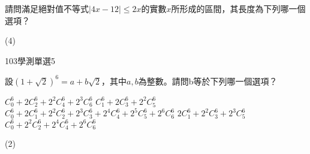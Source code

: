 \begin{QUESTIONS}
\begin{QUESTION}
\begin{QBODY}
            請問滿足絕對值不等式$\left| 4x-12 \right|\le 2x$的實數$x$所形成的區間，其長度為下列哪一個選項？
			\begin{QOPS}
			\end{QOPS}
        \end{QBODY}
        \begin{QFROMS}
        \end{QFROMS}
        \begin{QTAGS}\end{QTAGS}
        \begin{QANS}
            (4)
        \end{QANS}
        \begin{QSOLLIST}
        \end{QSOLLIST}
        \begin{QEMPTYSPACE}
        \end{QEMPTYSPACE}
    \end{QUESTION}
    \begin{QUESTION}
        \begin{ExamInfo}{103}{學測}{單選}{5}
        \end{ExamInfo}
        \begin{ExamAnsRateInfo}{69}{97}{77}{33}
        \end{ExamAnsRateInfo}
        \begin{QBODY}
            設${{(1+\sqrt{2})}^{6}}=a+b\sqrt{2}$，其中$a,b$為整數。請問b等於下列哪一個選項？
			\begin{QOPS}
				\QOP $C_{0}^{6}+2C_{2}^{6}+{{2}^{2}}C_{4}^{6}+{{2}^{3}}C_{6}^{6}$
				\QOP $C_{1}^{6}+2C_{3}^{6}+{{2}^{2}}C_{5}^{6}$
				\QOP $C_{0}^{6}+2C_{1}^{6}+{{2}^{2}}C_{2}^{6}+{{2}^{3}}C_{3}^{6}+{{2}^{4}}C_{4}^{6}+{{2}^{5}}C_{5}^{6}+{{2}^{6}}C_{6}^{6}$
				\QOP $2C_{1}^{6}+{{2}^{2}}C_{3}^{6}+{{2}^{3}}C_{5}^{6}$
				\QOP $C_{0}^{6}+{{2}^{2}}C_{2}^{6}+{{2}^{4}}C_{4}^{6}+{{2}^{6}}C_{6}^{6}$
			\end{QOPS}
        \end{QBODY}
        \begin{QFROMS}
        \end{QFROMS}
        \begin{QTAGS}\end{QTAGS}
        \begin{QANS}
            (2)
        \end{QANS}
        \begin{QSOLLIST}

\end{QSOLLIST}
\end{QUESTION}
\end{QUESTIONS}
